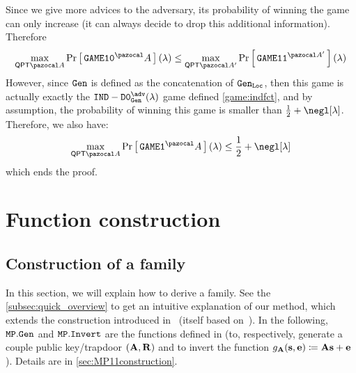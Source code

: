 \begin{proofE}
\begin{pcimage}
{{      }}
  \end{pcimage}
  Since we give more advices to the adversary, its probability of winning the game can only increase (it can always decide to drop this additional information). Therefore
  \begin{align}
    \max_{\QPT{} \cA} \pr{\texttt{GAME10}^\cA}(\lambda) \leq \max_{\QPT{} \cA'} \pr{\texttt{GAME11}^{\cA'}}(\lambda)
  \end{align}
  However, since ${\tt Gen}$ is defined as the concatenation of $ {\tt Gen}_{\tt Loc}$, then this game is actually exactly the $\INDFCT_{\Gen{}} ^\adv (\lambda)$ game defined \cref{game:indfct}, and by assumption, the probability of winning this game is smaller than $\frac{1}{2} + \negl[\lambda]$. Therefore, we also have:
  \begin{align}
    \max_{\QPT{} \cA} \pr{\texttt{GAME1}^\cA}(\lambda) \leq \frac{1}{2} + \negl[\lambda]
  \end{align}
  which ends the proof.
\end{proofE}


\section{Function construction}\label{sec:functionConstruction}

\subsection{Construction of a \AssumpFct{} family}\label{sec:construction_f_superpoly}

In this section, we will explain how to derive a \AssumpFct{} family. See the \cref{subsec:quick_overview} to get an intuitive explanation of our method, which extends the construction introduced in~\cite{CCKW_2019_qfactory} (itself based on~\cite{CCKW18}). In the following, ${\tt MP.Gen}$ and ${\tt MP.Invert}$ are the functions defined in \cite{MP11} (to, respectively, generate a couple public key/trapdoor $(\mathbf{A},\mathbf{R})$ and to invert the function $g_{\mathbf{A}}(\mathbf{s}, \mathbf{e}) \coloneqq \mathbf{A} \mathbf{s} + \mathbf{e}$). Details are in \cref{sec:MP11construction}.

